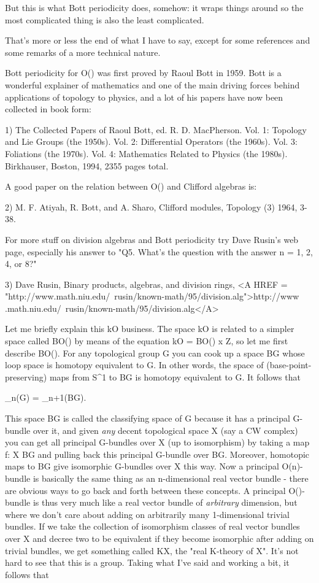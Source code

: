 But this is what Bott periodicity does, somehow: it wraps things around
so the most complicated thing is also the least complicated.

That's more or less the end of what I have to say, except for some
references and some remarks of a more technical nature.

Bott periodicity for O(\infty ) was first proved by Raoul Bott in
1959.  Bott is a wonderful explainer of mathematics and one of the
main driving forces behind applications of topology to physics, and
a lot of his papers have now been collected in book form:

1) The Collected Papers of Raoul Bott, ed. R. D. MacPherson.  Vol. 1:
Topology and Lie Groups (the 1950s).  Vol. 2: Differential Operators
(the 1960s).  Vol. 3: Foliations (the 1970s).  Vol. 4: Mathematics
Related to Physics (the 1980s).  Birkhauser, Boston, 1994, 2355 pages
total.  

A good paper on the relation between O(\infty ) and Clifford algebras
is:

2) M. F. Atiyah, R. Bott, and A. Sha\pi ro, Clifford modules, Topology 
(3) 1964, 3-38.  

For more stuff on division algebras and Bott periodicity try Dave Rusin's
web page, especially his answer to "Q5.  What's the question with the
answer n = 1, 2, 4, or 8?"

3) Dave Rusin, Binary products, algebras, and division rings,
<A HREF = "http://www.math.niu.edu/~rusin/known-math/95/division.alg">http://www
.math.niu.edu/~rusin/known-math/95/division.alg</A>

Let me briefly explain this kO business.  The space kO is 
related to a simpler space called BO(\infty ) by means of the
equation
kO = BO(\infty ) x Z,
so let me first describe BO(\infty ).  For any
topological group G you can cook up a space BG whose loop space is
homotopy equivalent to G.  In other words, the space of (base-point-preserving)
maps from S^{1} to BG is homotopy equivalent to G.  It follows that

\pi _{n}(G) = \pi _{n+1}(BG).

This space BG is called the classifying space of G because it has a
principal G-bundle over it, and given \emph{any} decent topological space X
(say a CW complex) you can get all principal G-bundles over X (up to
isomorphism) by taking a map f: X \to  BG and pulling back this
principal G-bundle over BG.  Moreover, homotopic maps to BG give
isomorphic G-bundles over X this way.  
Now a principal O(n)-bundle is
basically the same thing as an n-dimensional real vector bundle -
there are obvious ways to go back and forth between these concepts.  A
principal O(\infty )-bundle is thus very much like a real vector
bundle of \emph{arbitrary} dimension, but where we don't care about adding
on arbitrarily many 1-dimensional trivial bundles.  If we take the
collection of isomorphism classes of real vector bundles over X and
decree two to be equivalent if they become isomorphic after adding on
trivial bundles, we get something called KX, the "real K-theory of X".
It's not hard to see that this is a group.  Taking what I've said and
working a bit, it follows that

